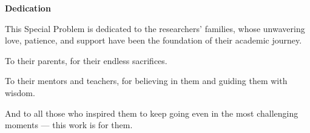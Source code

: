 \begin{center}
	\textbf{Dedication}
\end{center}

\vspace{2em}

This Special Problem is dedicated to the researchers’ families, whose unwavering love, patience, and support have been the foundation of their academic journey.

To their parents, for their endless sacrifices.

To their mentors and teachers, for believing in them and guiding them with wisdom.

And to all those who inspired them to keep going even in the most challenging moments — this work is for them.